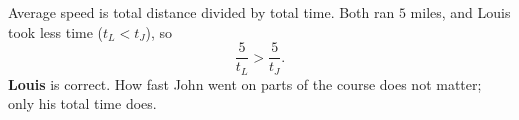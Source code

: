 Average speed is total distance divided by total time. Both ran $5$ miles, and Louis took less time ($t_L<t_J$), so
\[\dfrac{5}{t_L}>\dfrac{5}{t_J}.\]
\textbf{Louis} is correct. How fast John went on parts of the course does not matter; only his total time does.
